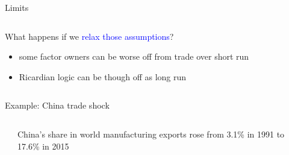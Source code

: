 \documentclass[notes,11pt, aspectratio=169, xcolor=table]{beamer}
\newcommand{\blue}[1]{\textcolor{blue}{#1}}
\newenvironment{wideitemize}{\itemize\addtolength{\itemsep}{10pt}}{\enditemize}
\begin{document}
\begin{frame}{Limits}
\begin{columns}[T]
\begin{column}{.6\textwidth}
\begin{wideitemize}
    
    \item<4-> What happens if we \blue{relax those assumptions}?
    \begin{itemize}
        \item some factor owners can be worse off from trade over short run
        \item Ricardian logic can be though off as long run
    \end{itemize}

    
\end{wideitemize}
\end{column}%
\end{columns}

\end{frame}



\begin{frame}{Example: China trade shock}


\begin{columns}[T] %
\begin{column}{.45\textwidth}
\end{column}%
\hfill%
\begin{column}{.55\textwidth}
{\small
\begin{wideitemize}
    \item<1-> China's share in world manufacturing exports rose from 3.1\% in 1991 to 17.6\% in 2015


\end{wideitemize}}
\end{column}
\end{columns}
\end{frame}
\end{document}
